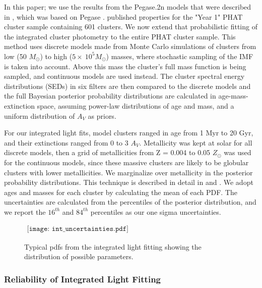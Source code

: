 \documentclass{emulateapj}
\begin{document}
In this paper; we use the results from the Pegase.2n models that were described in \cite{Fouesneau14}, which was based on Pegase \citep{Fioc97}.  \cite{Fouesneau14} published properties for the \cite{Johnson12} "Year 1" PHAT cluster sample containing 601 clusters.  We now extend that probabilistic fitting of the integrated cluster photometry to the entire PHAT cluster sample.  This method uses discrete models made from Monte Carlo simulations of clusters from low (50 $M_{\odot}$) to high ($5 \times\ 10^{5} M_{\odot}$) masses, where stochastic sampling of the IMF is taken into account.  Above this mass the cluster's full mass function is being sampled, and continuous models are used instead.  The cluster spectral energy distributions (SEDs) in six filters are then compared to the discrete models and the full Bayesian posterior probability distributions are calculated in age-mass-extinction space, assuming power-law distributions of age and mass, and a uniform distribution of $A_{V}$ as priors.  

For our integrated light fits, model clusters ranged in age from 1 Myr to 20 Gyr, and their extinctions ranged from 0 to 3 $A_V$.  Metallicity was kept at solar for all discrete models, then a grid of metallicities from Z = 0.004 to 0.05 $Z_{\odot}$ was used for the continuous models, since these massive clusters are likely to be globular clusters with lower metallicities.  We marginalize over metallicity in the posterior probability distributions.  This technique is described in detail in \cite{Fouesneau10} and \cite{Fouesneau14}.  We adopt ages and masses for each cluster by calculating the mean of each PDF.  The uncertainties are calculated from the percentiles of the posterior distribution, and we report the $16^{th}$ and $84^{th}$ percentiles as our one sigma uncertainties. 


\begin{figure*}[!htbp]
   \begin{center}$
     \begin{array}{cc}
        \texttt{[image: int\_uncertainties.pdf]} 
    \end{array}$
 \end{center}
  \caption{Typical pdfs from the integrated light fitting showing the distribution of possible parameters.}
  \label{fig:ap3219}
\end{figure*}




\subsubsection{Reliability of Integrated Light Fitting}\label{sec:int_verify}
\end{document}
